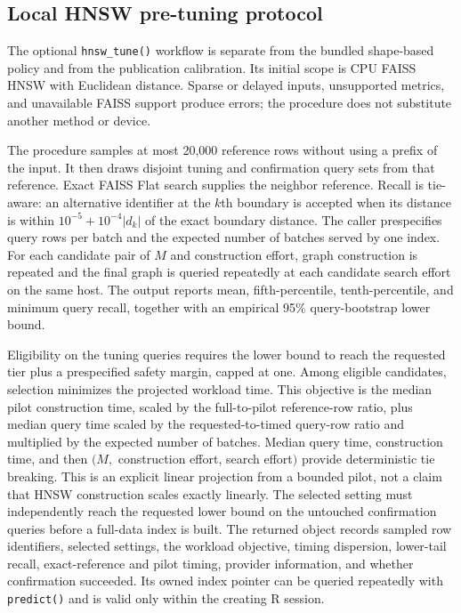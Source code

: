 \documentclass[11pt]{article}
\newcommand{\code}[1]{\texttt{#1}}
\begin{document}
\subsection{Local HNSW pre-tuning protocol} \label{sec:local-hnsw}

The optional \code{hnsw\_tune()} workflow is separate from the bundled
shape-based policy and from the publication calibration. Its initial scope is
CPU FAISS HNSW with Euclidean distance. Sparse or delayed inputs, unsupported
metrics, and unavailable FAISS support produce errors; the procedure does not
substitute another method or device.

The procedure samples at most 20,000 reference rows without using a prefix of
the input. It then draws disjoint tuning and confirmation query sets from that
reference. Exact FAISS Flat search supplies the neighbor reference. Recall is
tie-aware: an alternative identifier at the $k$th boundary is accepted when
its distance is within $10^{-5}+10^{-4}|d_k|$ of the exact boundary distance.
The caller prespecifies query rows per batch and the expected number of batches
served by one index. For each candidate pair of $M$ and construction effort,
graph construction is repeated and the final graph is queried repeatedly at
each candidate search effort on the same host. The output reports mean,
fifth-percentile, tenth-percentile, and minimum query recall, together with an
empirical 95\% query-bootstrap lower bound.

Eligibility on the tuning queries requires the lower bound to reach the
requested tier plus a prespecified safety margin, capped at one. Among eligible
candidates, selection minimizes the projected workload time. This objective is
the median pilot construction time, scaled by the full-to-pilot reference-row
ratio, plus median query time scaled by the requested-to-timed query-row ratio
and multiplied by the expected number of batches. Median query time,
construction time, and then $(M,$ construction effort, search effort$)$ provide
deterministic tie breaking. This is an explicit linear projection from a
bounded pilot, not a claim that HNSW construction scales exactly linearly. The
selected setting must independently reach the requested
lower bound on the untouched confirmation queries before a full-data index is
built. The returned object records sampled row identifiers, selected settings,
the workload objective, timing dispersion, lower-tail recall, exact-reference
and pilot timing, provider information, and whether confirmation succeeded.
Its owned index pointer can be queried
repeatedly with \code{predict()} and is valid only within the creating R
session.
\end{document}
